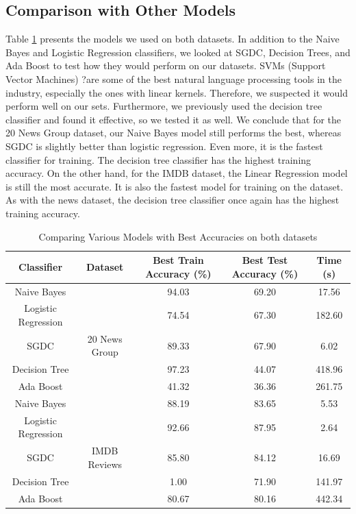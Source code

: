 \documentclass{homework}
\begin{document}
\subsection{Comparison with Other Models}
Table \ref{table-models} presents the models we used on both datasets. In addition to the Naive Bayes and Logistic Regression classifiers, we looked at SGDC, Decision Trees, and Ada Boost to test how they would perform on our datasets. SVMs (Support Vector Machines) ?are some of the best natural language processing tools in the industry, especially the ones with linear kernels. Therefore, we suspected it would perform well on our sets. Furthermore, we previously used the decision tree classifier and found it effective, so we tested it as well. We conclude that for the 20 News Group dataset, our Naive Bayes model still performs the best, whereas SGDC is slightly better than logistic regression. Even more, it is the fastest classifier for training. The decision tree classifier has the highest training accuracy. On the other hand, for the IMDB dataset, the Linear Regression model is still the most accurate. It is also the fastest model for training on the dataset. As with the news dataset, the decision tree classifier once again has the highest training accuracy. 


\begin{table}[h!] 
\centering
\begin{tabular}{||c c c c c||} 
 \hline
 Classifier & Dataset & Best Train Accuracy (\%) & Best Test Accuracy (\%) & Time (s)\\ [0.5ex] 
 \hline\hline
 Naive Bayes && 94.03 & 69.20 & 17.56 \\ 
 Logistic Regression && 74.54 & 67.30 & 182.60 \\
 SGDC & 20 News Group & 89.33 & 67.90 & 6.02 \\
 Decision Tree && 97.23 & 44.07 & 418.96 \\
  Ada Boost && 41.32 & 36.36 & 261.75\\
 \hline \hline
 Naive Bayes && 88.19 & 83.65 & 5.53 \\
 Logistic Regression && 92.66 & 87.95 & 2.64 \\
 SGDC & IMDB Reviews & 85.80 & 84.12 & 16.69 \\
 Decision Tree && 1.00 & 71.90 & 141.97 \\
 Ada Boost && 80.67 & 80.16 & 442.34 \\[1ex] 
 \hline
\end{tabular}
\caption{Comparing Various Models with Best Accuracies on both datasets}
\label{table-models}
\end{table}
\end{document}
